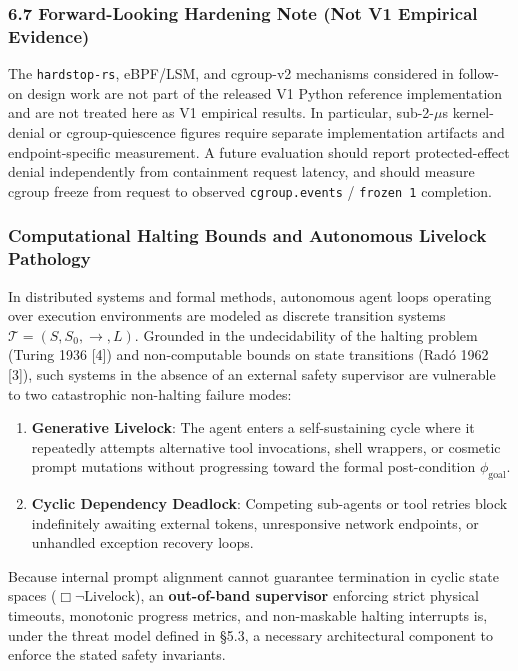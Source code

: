 \documentclass[
  10pt,letterpaper]{article}
\providecommand{\tightlist}{%
  \setlength{\itemsep}{0pt}\setlength{\parskip}{0pt}}
\begin{document}
\subsubsection{6.7 Forward-Looking Hardening Note (Not V1 Empirical Evidence)}
\label{forward-looking-hardening-note-not-v1-evidence}

The \texttt{hardstop-rs}, eBPF/LSM, and cgroup-v2 mechanisms considered in
follow-on design work are not part of the released V1 Python reference
implementation and are not treated here as V1 empirical results. In
particular, sub-2-\(\mu\)s kernel-denial or cgroup-quiescence figures require
separate implementation artifacts and endpoint-specific measurement. A
future evaluation should report protected-effect denial independently from
containment request latency, and should measure cgroup freeze from request to
observed \texttt{cgroup.events} / \texttt{frozen 1} completion.

\subsubsection{Computational Halting Bounds and Autonomous Livelock
Pathology}\label{computational-halting-bounds-and-autonomous-livelock-pathology}

In distributed systems and formal methods, autonomous agent loops
operating over execution environments are modeled as discrete transition
systems \(\mathcal{T} = (S, S_0, \to, L)\). Grounded in the
undecidability of the halting problem (Turing 1936 {[}4{]}) and
non-computable bounds on state transitions (Radó 1962 {[}3{]}), such
systems in the absence of an external safety supervisor are vulnerable
to two catastrophic non-halting failure modes:

\begin{enumerate}
\def\labelenumi{\arabic{enumi}.}
\tightlist
\item
  \textbf{Generative Livelock}: The agent enters a self-sustaining cycle
  where it repeatedly attempts alternative tool invocations, shell
  wrappers, or cosmetic prompt mutations without progressing toward the
  formal post-condition \(\phi_{\text{goal}}\).
\item
  \textbf{Cyclic Dependency Deadlock}: Competing sub-agents or tool
  retries block indefinitely awaiting external tokens, unresponsive
  network endpoints, or unhandled exception recovery loops.
\end{enumerate}

Because internal prompt alignment cannot guarantee termination in cyclic
state spaces (\(\Box \neg \text{Livelock}\)), an \textbf{out-of-band
supervisor} enforcing strict physical timeouts, monotonic progress
metrics, and non-maskable halting interrupts is, under the threat model
defined in §5.3, a necessary architectural component to enforce the
stated safety invariants.
\end{document}
